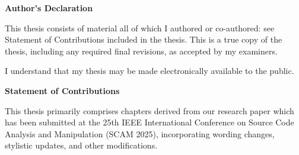 \cleardoublepage %
 

 \begin{center}\textbf{Author's Declaration}\end{center}

 \noindent
This thesis consists of material all of which I authored or co-authored: see Statement of
Contributions included in the thesis. This is a true copy of the thesis, including any required final revisions, as accepted by my examiners.
 \noindent  
  \bigskip
  
  \noindent
I understand that my thesis may be made electronically available to the public.

\cleardoublepage
{}    %

 \begin{center}\textbf{Statement of Contributions}\end{center}

This thesis primarily comprises chapters derived from our research paper which has been
submitted at the 25th IEEE International Conference on Source Code Analysis and Manipulation (SCAM 2025), incorporating wording changes, stylistic updates, and other
modifications.

